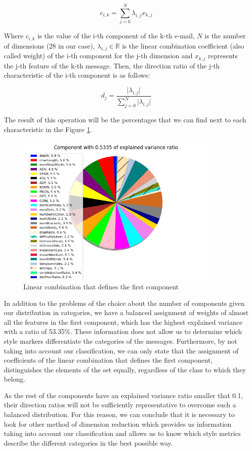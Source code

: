 $$
c_{i, k} = \sum_{j = 0}^N\lambda_{i, j}x_{k, j}
$$

Where $c_{i, k}$ is the value of the i-th component of the k-th e-mail, $N$ is the number of dimensions (28 in our case), $\lambda_{i, j}\in\mathds{R}$ is the linear combination coefficient (also called weight) of the i-th component for the j-th dimension and $x_{k, j}$ represents the j-th feature of the k-th message. Then, the direction ratio of the j-th characteristic of the i-th component is as follows:

$$
d_j = \frac{\lvert\lambda_{i,j}\rvert}{\sum_{j = 0}^N\lvert\lambda_{i, j}\rvert}
$$

The result of this operation will be the percentages that we can find next to each characteristic in the Figure \ref{fig:comp0pie}.

\begin{figure}
	\centering%
	\centerline{\includegraphics[width=0.9\textwidth]{Imagenes/Bitmap/PCA/comp0pie.png}}%
	\caption{Linear combination that defines the first component}%
	\label{fig:comp0pie}
\end{figure}

In addition to the problems of the choice about the number of components given our distribution in categories, we have a balanced assignment of weights of almost all the features in the first component, which has the highest explained variance with a ratio of 53.35\%. These information does not allow us to determine which style markers differentiate the categories of the messages. Furthermore, by not taking into account our classification, we can only state that the assignment of coefficients of the linear combination that defines the first component, distinguishes the elements of the set equally, regardless of the class to which they belong.

As the rest of the components have an explained variance ratio smaller that 0.1, their direction ratios will not be sufficiently representative to overcome such a balanced distribution. For this reason, we can conclude that it is necessary to look for other method of dimension reduction which provides us information taking into account our classification and allows us to know which style metrics describe the different categories in the best possible way.